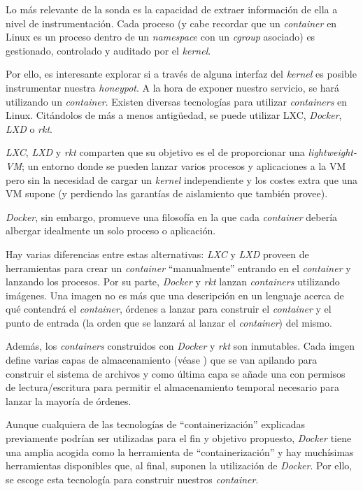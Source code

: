 Lo más relevante de la sonda es la capacidad de extraer información de ella a nivel de instrumentación. Cada proceso (y cabe recordar que un \emph{container} en Linux es un proceso dentro de un \emph{namespace} con un \emph{cgroup} asociado) es gestionado, controlado
y auditado por el \emph{kernel}.

Por ello, es interesante explorar si a través de alguna interfaz del \emph{kernel} es posible instrumentar nuestra \emph{honeypot}. A la hora de exponer nuestro servicio, se hará utilizando
un \emph{container}. Existen diversas tecnologías para utilizar \emph{containers} en Linux. Citándolos de más a menos antigüedad, se puede utilizar LXC, \emph{Docker}, \emph{LXD} o \emph{rkt}.

\emph{LXC}, \emph{LXD} y \emph{rkt} comparten que su objetivo es el de proporcionar una \emph{lightweight-VM}; un entorno donde se pueden lanzar varios procesos y aplicaciones a la VM
pero sin la necesidad de cargar un \emph{kernel} independiente y los costes extra que una VM supone (y perdiendo las garantías de aislamiento que también provee).

\emph{Docker}, sin embargo, promueve una filosofía en la que cada \emph{container} debería albergar idealmente un solo proceso o aplicación.

Hay varias diferencias entre estas alternativas: \emph{LXC} y \emph{LXD} proveen de herramientas para crear un \emph{container} ``manualmente'' entrando en el \emph{container} y lanzando los procesos. Por su parte, \emph{Docker} y \emph{rkt}
lanzan \emph{containers} utilizando imágenes. Una imagen no es más que una descripción en un lenguaje acerca de qué contendrá el \emph{container}, órdenes a lanzar para construir el \emph{container} y el punto de entrada (la orden que se lanzará al lanzar el \emph{container}) del mismo.

Además, los \emph{containers} construidos con \emph{Docker} y \emph{rkt} son inmutables. Cada imgen define varias capas de almacenamiento (véase \cite{docker-storage}) que se van apilando
para construir el sistema de archivos y como última capa se añade una con permisos de lectura/escritura para permitir el almacenamiento temporal necesario para lanzar
la mayoría de órdenes.

Aunque cualquiera de las tecnologías de ``containerización'' explicadas previamente podrían ser utilizadas para el fin y objetivo propuesto, \emph{Docker} tiene una amplia acogida como la herramienta de ``containerización''
y hay muchísimas herramientas disponibles que, al final, suponen la utilización de \emph{Docker}. Por ello, se escoge esta tecnología para construir nuestros \emph{container}.


